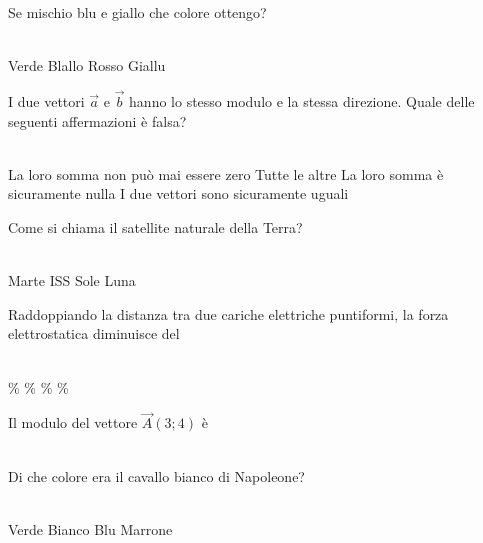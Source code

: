 \documentclass[a4paper,11pt]{exam}
\begin{document}
    
    \newpage
    
    

        \begin{center} 
        \end{center}
\begin{questions}

    
\question Se mischio blu e giallo che colore ottengo?\\\
\begin{oneparchoices}
  \choice Verde
  \choice Blallo
  \choice Rosso
  \choice Giallu
\end{oneparchoices}

    
\question I due vettori $\vec{a}$ e $\vec{b}$ hanno lo stesso modulo e la stessa direzione. Quale delle seguenti affermazioni è falsa?\\\
\begin{oneparchoices}
  \choice La loro somma non può mai essere zero
  \choice Tutte le altre
  \choice La loro somma è sicuramente nulla
  \choice I due vettori sono sicuramente uguali
\end{oneparchoices}

    
\question Come si chiama il satellite naturale della Terra?\\\
\begin{oneparchoices}
  \choice Marte
  \choice ISS
  \choice Sole
  \choice Luna
\end{oneparchoices}

    
\question Raddoppiando la distanza tra due cariche elettriche puntiformi, la forza elettrostatica diminuisce del\\\
\begin{oneparchoices}
  \choice 50\%
  \choice 90\%
  \choice 75\%
  \%
\end{oneparchoices}

    
\question Il modulo del vettore $\vec{A}(3;4)$ è\\\
\begin{oneparchoices}
  \choice 12
  \choice 5
  \choice 8
  \choice 25
\end{oneparchoices}

    
\question Di che colore era il cavallo bianco di Napoleone?\\\
\begin{oneparchoices}
  \choice Verde
  \choice Bianco
  \choice Blu 
  \choice Marrone
\end{oneparchoices}


\end{questions}
\end{document}
